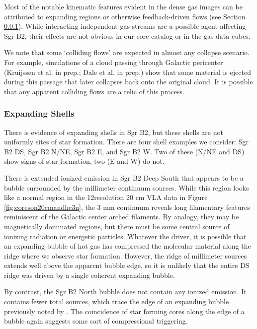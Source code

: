 \documentclass[twocolumn]{aastex61}
\begin{document}
Most of the notable kinematic features evident in the dense gas images can be
attributed to expanding \hii regions or otherwise feedback-driven flows (see
Section \ref{sec:expandingshells}).  While interacting independent gas streams
are a possible agent affecting Sgr B2, their effects are not obvious in our
core catalog or in the gas data cubes.

We note that some `colliding flows' are expected in almost any collapse
scenario.  For example, simulations of a cloud passing through Galactic
pericenter (Kruijssen et al. in prep.; Dale et al. in prep.) show that some
material is ejected during this passage that later collapses back onto the
original cloud.  It is possible that any apparent colliding flows
\citep[e.g.][]{Sato2000a} are a relic of this process.

\subsubsection{Expanding Shells}
\label{sec:expandingshells}
There is evidence of expanding shells in Sgr B2, but 
these shells are not uniformly sites of star formation.
There are four shell examples we consider: Sgr B2 DS, Sgr B2 N/NE,
Sgr B2 E, and Sgr B2 W.  Two of these (N/NE and DS) show signs
of star formation, two (E and W) do not.

There is extended ionized emission in Sgr B2 Deep South that appears to be a
bubble surrounded by the millimeter continuum sources.  While this region looks
like a normal \hii region in the 12\arcsec resolution 20 cm
VLA data in Figure \ref{fig:coreson20cmandhc3n}, the 3 mm continuum reveals long
filamentary features reminiscent of the Galactic center arched filaments.  By
analogy, they may be magnetically dominated regions, but there must be some
central source of ionizing radiation or energetic particles.  Whatever the
driver, it is possible that an expanding bubble of hot gas has compressed
the molecular material along the ridge where we observe star formation.
However, the ridge of millimeter sources extends well above the apparent bubble
edge, so it is unlikely that the entire DS ridge was driven by a single
coherent expanding bubble.

By contrast, the Sgr B2 North bubble does not contain any ionized emission.  It
contains fewer total sources, which trace the edge of an expanding bubble
previously noted by \citet{de-Vicente1997a}.  The coincidence of star forming
cores along the edge of a bubble again suggests some sort of compressional
triggering.
\end{document}
